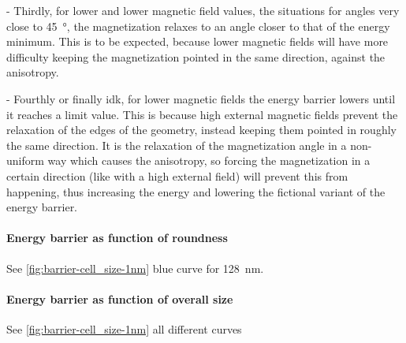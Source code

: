 \documentclass[10pt,a4paper]{article}
\begin{document}
- Thirdly, for lower and lower magnetic field values, the situations for angles very close to \SI{45}{\degree}, the magnetization relaxes to an angle closer to that of the energy minimum. This is to be expected, because lower magnetic fields will have more difficulty keeping the magnetization pointed in the same direction, against the anisotropy.

- Fourthly or finally idk, for lower magnetic fields the energy barrier lowers until it reaches a limit value. This is because high external magnetic fields prevent the relaxation of the edges of the geometry, instead keeping them pointed in roughly the same direction. It is the relaxation of the magnetization angle in a non-uniform way which causes the anisotropy, so forcing the magnetization in a certain direction (like with a high external field) will prevent this from happening, thus increasing the energy and lowering the fictional variant of the energy barrier.

\paragraph{Energy barrier as function of roundness}
See \cref{fig:barrier-cell_size-1nm} blue curve for \SI{128}{\nano\metre}.

\paragraph{Energy barrier as function of overall size}
See \cref{fig:barrier-cell_size-1nm} all different curves
\end{document}
